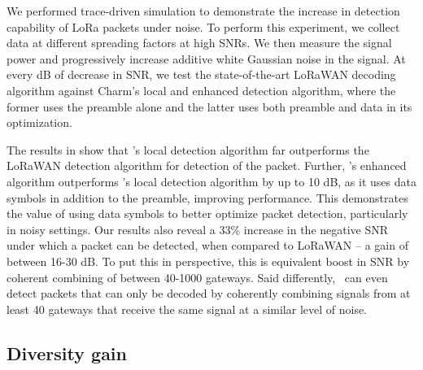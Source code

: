 We performed trace-driven simulation to demonstrate the increase in detection capability of LoRa packets under noise. To perform this experiment, we collect data at different spreading factors at high SNRs. We then measure the signal power and progressively increase additive white Gaussian noise in the signal. At every dB of decrease in SNR, we test the state-of-the-art LoRaWAN decoding algorithm against Charm's local and enhanced detection algorithm, where the former uses the preamble alone and the latter uses both preamble and data in its optimization. 

The results in  show that \name's local detection algorithm far outperforms the LoRaWAN detection algorithm for detection of the packet. Further, \name's enhanced algorithm outperforms \name's local detection algorithm by up to 10 dB, as it uses data symbols in addition to the preamble, improving performance. This demonstrates the value of using data symbols to better optimize packet detection, particularly in noisy settings. Our results also reveal a 33\% increase in the negative SNR under which a packet can be detected, when compared to LoRaWAN -- a gain of between 16-30 dB. To put this in perspective, this is equivalent boost in SNR by coherent combining of between 40-1000 gateways. Said differently, \name\ can even detect packets that can only be decoded by coherently combining signals from at least 40 gateways that receive the same signal at a similar level of noise. 

\subsection{Diversity gain}
\label{sec:diversity-gain-eval}



